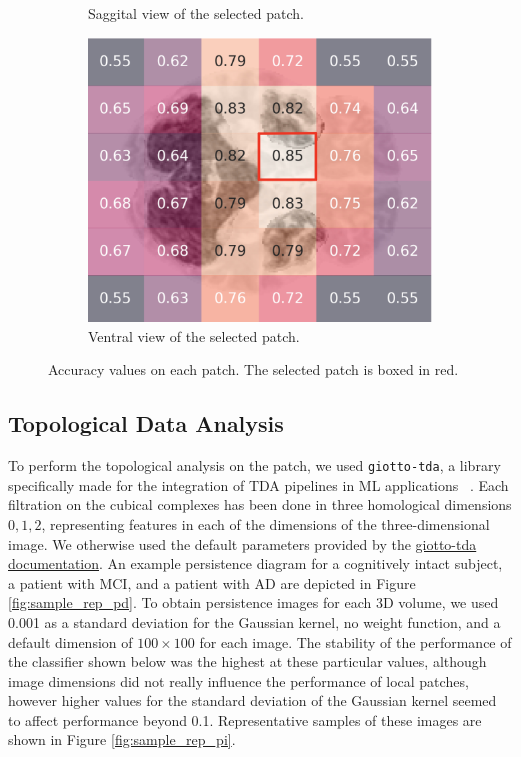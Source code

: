 \documentclass{article}
\begin{document}
\begin{figure}[b]
\begin{subfigure}{0.32\textwidth}
    \caption{Saggital view of the selected patch.}
  \end{subfigure}
  \hfill
  \begin{subfigure}{0.32\textwidth}
    \includegraphics[width=\textwidth]{figures/perf_ventral.png}
    \caption{Ventral view of the selected patch.}
  \end{subfigure}
  \caption{Accuracy values on each patch. The selected patch is boxed in red.}
  \label{fig:acc}
\end{figure}

\subsection{Topological Data Analysis}\label{sec:tda_setup}

To perform the topological analysis on the patch, we used \texttt{giotto-tda}, a library
specifically made for the integration of TDA pipelines in ML applications ~\citep{tauzin2020giottotda}. Each
filtration on the cubical complexes has been done in three homological dimensions $0,1,2$,
representing features in each of the dimensions of the three-dimensional image. We otherwise used
the default parameters provided by the
\href{https://giotto-ai.github.io/gtda-docs/latest/modules/generated/homology/gtda.homology.CubicalPersistence.html#id2}{giotto-tda
  documentation}. An example persistence diagram for a cognitively intact subject, a patient with MCI, and a
patient with AD are depicted in Figure \ref{fig:sample_rep_pd}. To obtain persistence images for each 3D
volume, we used 0.001 as a standard deviation for the Gaussian kernel, no weight function, and a
default dimension of $100 \times 100$ for each image. The stability of the performance of the
classifier shown below was the highest at these particular values, although image dimensions did not
really influence the performance of local patches, however higher values for the standard deviation
of the Gaussian kernel seemed to affect performance beyond 0.1. Representative samples of these images are
shown in Figure \ref{fig:sample_rep_pi}.
\end{document}
